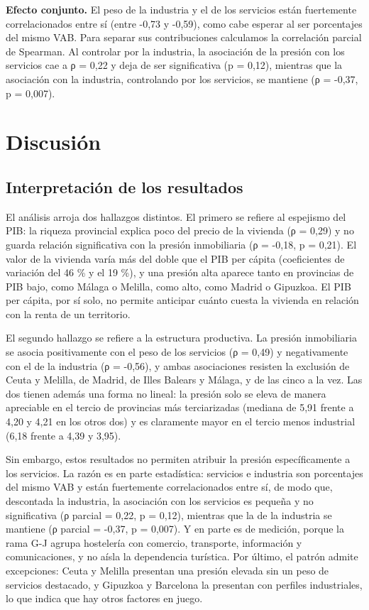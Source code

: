 \documentclass[econometrics,article,submit,moreauthors,pdftex]{Definitions/mdpi}
\begin{document}
\textbf{Efecto conjunto.} El peso de la industria y el de los servicios
están fuertemente correlacionados entre sí (entre -0,73 y -0,59), como
cabe esperar al ser porcentajes del mismo VAB. Para separar sus
contribuciones calculamos la correlación parcial de Spearman. Al
controlar por la industria, la asociación de la presión con los
servicios cae a ρ = 0,22 y deja de ser significativa (p = 0,12),
mientras que la asociación con la industria, controlando por los
servicios, se mantiene (ρ = -0,37, p = 0,007).

\section{Discusión}\label{discusiuxf3n}

\subsection{Interpretación de los
resultados}\label{interpretaciuxf3n-de-los-resultados}

El análisis arroja dos hallazgos distintos. El primero se refiere al
espejismo del PIB: la riqueza provincial explica poco del precio de la
vivienda (ρ = 0,29) y no guarda relación significativa con la presión
inmobiliaria (ρ = -0,18, p = 0,21). El valor de la vivienda varía más
del doble que el PIB per cápita (coeficientes de variación del 46 \% y
el 19 \%), y una presión alta aparece tanto en provincias de PIB bajo,
como Málaga o Melilla, como alto, como Madrid o Gipuzkoa. El PIB per
cápita, por sí solo, no permite anticipar cuánto cuesta la vivienda en
relación con la renta de un territorio.

El segundo hallazgo se refiere a la estructura productiva. La presión
inmobiliaria se asocia positivamente con el peso de los servicios (ρ =
0,49) y negativamente con el de la industria (ρ = -0,56), y ambas
asociaciones resisten la exclusión de Ceuta y Melilla, de Madrid, de
Illes Balears y Málaga, y de las cinco a la vez. Las dos tienen además
una forma no lineal: la presión solo se eleva de manera apreciable en el
tercio de provincias más terciarizadas (mediana de 5,91 frente a 4,20 y
4,21 en los otros dos) y es claramente mayor en el tercio menos
industrial (6,18 frente a 4,39 y 3,95).

Sin embargo, estos resultados no permiten atribuir la presión
específicamente a los servicios. La razón es en parte estadística:
servicios e industria son porcentajes del mismo VAB y están fuertemente
correlacionados entre sí, de modo que, descontada la industria, la
asociación con los servicios es pequeña y no significativa (ρ parcial =
0,22, p = 0,12), mientras que la de la industria se mantiene (ρ parcial
= -0,37, p = 0,007). Y en parte es de medición, porque la rama G-J
agrupa hostelería con comercio, transporte, información y
comunicaciones, y no aísla la dependencia turística. Por último, el
patrón admite excepciones: Ceuta y Melilla presentan una presión elevada
sin un peso de servicios destacado, y Gipuzkoa y Barcelona la presentan
con perfiles industriales, lo que indica que hay otros factores en
juego.
\end{document}
